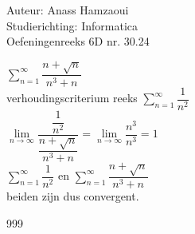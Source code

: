 \documentclass[a4paper]{article}
\begin{document}
  
\noindent \large Auteur: Anass Hamzaoui \\
\noindent \large Studierichting: Informatica \\
\noindent \large Oefeningenreeks 6D nr. 30.24 \\

\medskip

\normalsize

$\displaystyle\sum_{n=1}^\infty \dfrac{n+\sqrt{n}}{n^3 +n}$ \\

verhoudingscriterium reeks $\displaystyle\sum_{n=1}^\infty \dfrac{1}{n^2}$ \\

$\lim\limits_{n \rightarrow \infty} \dfrac{\dfrac{1}{n^2}}{\dfrac{n+\sqrt{n}}{n^3 +n}} = \lim\limits_{n \rightarrow \infty} \dfrac{n^3}{n^3} = 1$ \\

$\displaystyle\sum_{n=1}^\infty \dfrac{1}{n^2}$ en $\displaystyle\sum_{n=1}^\infty \dfrac{n+\sqrt{n}}{n^3 +n}$ \\

beiden zijn dus convergent.

\begin{thebibliography}{999}
\end{thebibliography}
\end{document}
